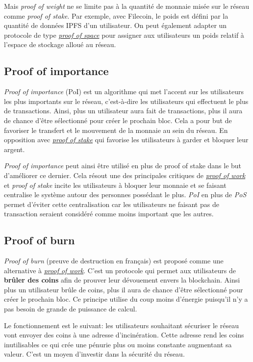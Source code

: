 Mais \emph{proof of weight} ne se limite pas à la quantité de monnaie misée sur le réseau comme \emph{proof of stake}. Par exemple, avec Filecoin, le poids est défini par la quantité de données IPFS d'un utilisateur. On peut également adapter un protocole de type \hyperref[consensus:pospace]{\emph{proof of space}} pour assigner aux utilisateurs un poids relatif à l'espace de stockage alloué au réseau.

\subsection{Proof of importance}

\emph{Proof of importance} (PoI) est un algorithme qui met l'accent sur les utilisateurs les plus importants sur le réseau, c'est-à-dire les utilisateurs qui effectuent le plus de transactions. Ainsi, plus un utilisateur aura fait de transactions, plus il aura de chance d'être sélectionné pour créer le prochain bloc. Cela a pour but de favoriser le transfert et le mouvement de la monnaie au sein du réseau. En opposition avec \hyperref[consensus:pos]{\emph{proof of stake}} qui favorise les utilisateurs à garder et bloquer leur argent.

\emph{Proof of importance} peut ainsi être utilisé en plus de proof of stake dans le but d'améliorer ce dernier. Cela résout une des principales critiques de \hyperref[consensus:pow]{\emph{proof of work}} et \emph{proof of stake} incite les utilisateurs à bloquer leur monnaie et se faisant centralise le système autour des personnes possédant le plus. \emph{PoI} en plus de \emph{PoS} permet d'éviter cette centralisation car les utilisateurs ne faisant pas de transaction seraient considéré comme moins important que les autres.

\subsection{Proof of burn}

\emph{Proof of burn} (preuve de destruction en français) est proposé comme une alternative à \hyperref[consensus:pow]{\emph{proof of work}}. C'est un protocole qui permet aux utilisateurs de \textbf{brûler des coins} afin de prouver leur dévouement envers la blockchain. Ainsi plus un utilisateur brûle de coins, plus il aura de chance d'être sélectionné pour créer le prochain bloc. Ce principe utilise du coup moins d'énergie puisqu'il n'y a pas besoin de grande de puissance de calcul.

Le fonctionnement est le suivant: les utilisateurs souhaitant sécuriser le réseau vont envoyer des coins à une adresse d'incinération. Cette adresse rend les coins inutilisables ce qui crée une pénurie plus ou moins constante augmentant sa valeur. C'est un moyen d'investir dans la sécurité du réseau.


